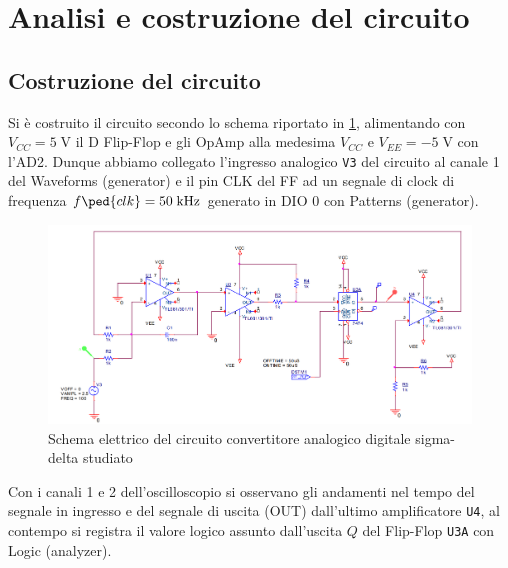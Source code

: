 \documentclass[10pt, a4paper, italian]{article}
\begin{document}
\setcounter{section}{0}
\section{Analisi e costruzione del circuito}\label{sec: AC}
\subsection{Costruzione del circuito}
Si è costruito il circuito secondo lo schema riportato in \cref{schm: ADC},
alimentando con $V_{CC} = 5 \; \si{\V}$ il D Flip-Flop e gli OpAmp alla
medesima $V_{CC}$ e $V_{EE} = -5 \; \si{\V}$ con l'AD2.
Dunque abbiamo collegato l'ingresso analogico \verb+V3+ del circuito al
canale 1 del Waveforms (generator) e il pin CLK del FF ad un segnale di
clock di frequenza $f\ped{clk} = 50 \; \si{k\Hz}$ generato in DIO 0 con
Patterns (generator).
\begin{figure}[htbp]
    \centering
	\includegraphics[width=\textwidth]{schem}
    \caption{Schema elettrico del circuito convertitore analogico digitale
    sigma-delta studiato \label{schm: ADC}}
\end{figure}
Con i canali 1 e 2 dell'oscilloscopio si osservano gli andamenti nel tempo del
segnale in ingresso e del segnale di uscita (OUT) dall'ultimo amplificatore
\verb+U4+, al contempo si registra il valore logico assunto dall'uscita $Q$
del Flip-Flop \verb+U3A+ con Logic (analyzer).
\end{document}
